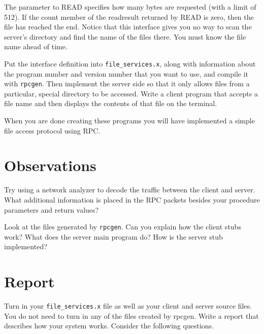 \documentclass[twocolumn]{article}
\begin{document}
The parameter to READ specifies how many bytes are requested (with a limit of 512). If the count
member of the readresult returned by READ is zero, then the file has reached the end. Notice
that this interface gives you no way to scan the server's directory and find the name of the
files there. You must know the file name ahead of time.

Put the interface definition into \texttt{file\_services.x}, along with information about the
program number and version number that you want to use, and compile it with \texttt{rpcgen}.
Then implement the server side so that it only allows files from a particular, special directory
to be accessed. Write a client program that accepts a file name and then displays the contents
of that file on the terminal.

When you are done creating these programs you will have implemented a simple file access
protocol using RPC.

\section{Observations}

Try using a network analyzer to decode the traffic between the client and server. What
additional information is placed in the RPC packets besides your procedure parameters and return
values?

Look at the files generated by \texttt{rpcgen}. Can you explain how the client stubs work? What
does the server main program do? How is the server stub implemented?

\section{Report}

Turn in your \texttt{file\_services.x} file as well as your client and server source files. You
do not need to turn in any of the files created by rpcgen. Write a report that describes how
your system works. Consider the following questions.
\end{document}
